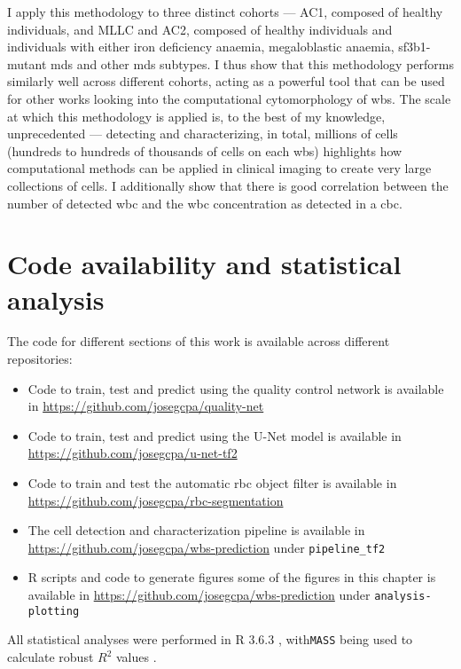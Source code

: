 I apply this methodology to three distinct cohorts --- AC1, composed of healthy individuals, and MLLC and AC2, composed of healthy individuals and individuals with either iron deficiency anaemia, megaloblastic anaemia, \ac{sf3b1}-mutant \ac{mds} and other \ac{mds} subtypes. I thus show that this methodology performs similarly well across different cohorts, acting as a powerful tool that can be used for other works looking into the computational cytomorphology of \ac{wbs}. The scale at which this methodology is applied is, to the best of my knowledge, unprecedented --- detecting and characterizing, in total, millions of cells (hundreds to hundreds of thousands of cells on each \ac{wbs}) highlights how computational methods can be applied in clinical imaging to create very large collections of cells. I additionally show that there is good correlation between the number of detected \ac{wbc} and the \ac{wbc} concentration as detected in a \ac{cbc}.

\section{Code availability and statistical analysis}

The code for different sections of this work is available across different repositories:

\begin{itemize}
    \item Code to train, test and predict using the quality control network is available in \url{https://github.com/josegcpa/quality-net}
    \item Code to train, test and predict using the U-Net model is available in \url{https://github.com/josegcpa/u-net-tf2}
    \item Code to train and test the automatic \ac{rbc} object filter is available in \url{https://github.com/josegcpa/rbc-segmentation}
    \item The cell detection and characterization pipeline is available in \url{https://github.com/josegcpa/wbs-prediction} under \texttt{pipeline\_tf2}
    \item R scripts and code to generate figures some of the figures in this chapter is available in \url{https://github.com/josegcpa/wbs-prediction} under \texttt{analysis-plotting}

\end{itemize}

All statistical analyses were performed in R 3.6.3 \cite{R-core-team}, with\texttt{MASS} being used to calculate robust $R^2$ values \cite{Venables-2002-mass}. 